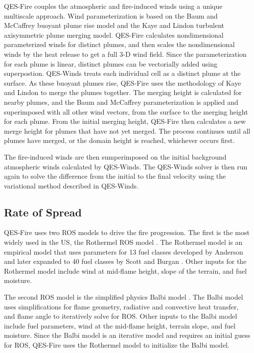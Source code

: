 QES-Fire couples the atmospheric and fire-induced winds using a unique multiscale approach. Wind parameterization is based on the Baum and McCaffrey \cite{Baum1989} buoyant plume rise model and the Kaye and Lindon \cite{kaye_linden_2004} turbulent axisymmetric plume merging model. QES-Fire calculates nondimensional parameterized winds for distinct plumes, and then scales the nondimensional winds by the heat release to get a full 3-D wind field. Since the parameterization for each plume is linear, distinct plumes can be vectorially added using superpostion. QES-Winds treats each individual cell as a distinct plume at the surface. As these buoyant plumes rise, QES-Fire uses the methodology of Kaye and Lindon to merge the plumes together. The merging height is calculated for nearby plumes, and the Baum and McCaffrey parameterization is applied and superimposed with all other wind vectors, from the surface to the merging height for each plume. From the initial merging height, QES-Fire then calculates a new merge height for plumes that have not yet merged. The process continues until all plumes have merged, or the domain height is reached, whichever occurs first. 

The fire-induced winds are then sumperimposed on the initial background atmospheric winds calculated by QES-Winds. The QES-Winds solver is then run again to solve the difference from the initial to the final velocity using the variational method described in QES-Winds. 

\subsection{Rate of Spread}

QES-Fire uses two ROS models to drive the fire progression. The first is the most widely used in the US, the Rothermel ROS model \cite{Rothermel1972}. The Rothermel model is an empirical model that uses parameters for 13 fuel classes developed by Anderson \cite{anderson1982} and later expanded to 40 fuel classes by Scott and Burgan \cite{scott2005standard}. Other inputs for the Rothermel model include wind at mid-flame height, slope of the terrain, and fuel moisture. 

The second ROS model is the simplified physics Balbi model \cite{Balbi2020}. The Balbi model uses simplifications for flame geometry, radiative and convective heat transfer, and flame angle to iteratively solve for ROS. Other inputs to the Balbi model include fuel parameters, wind at the mid-flame height, terrain slope, and fuel moisture. Since the Balbi model is an iterative model and requires an initial guess for ROS, QES-Fire uses the Rothermel model to initialize the Balbi model. 

